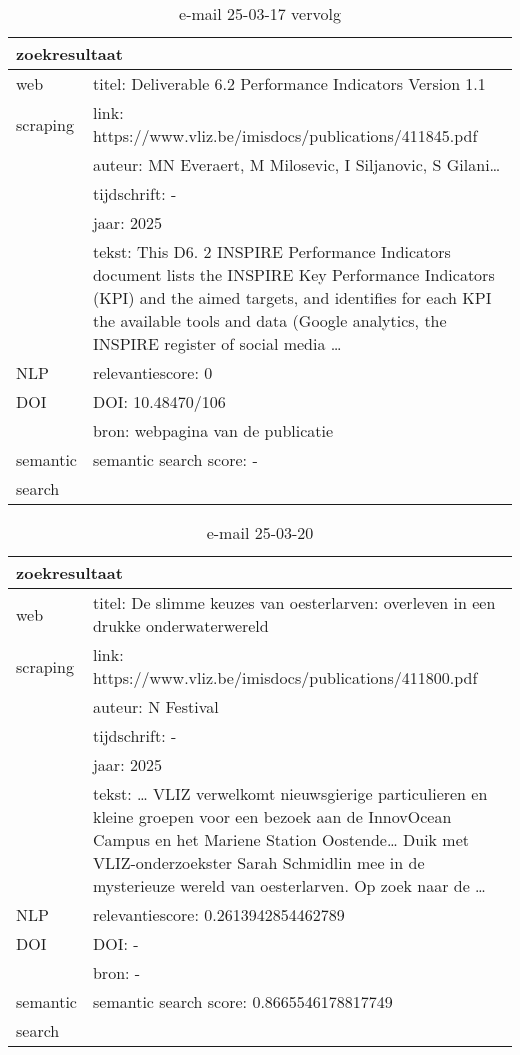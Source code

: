 \begin{table}[h!]
    \caption{e-mail 25-03-17 vervolg}
    \centering
    \begin{tabularx}{\textwidth}{|p{4cm}|X|} 
        \hline
        \multicolumn{2}{|X|}{\textbf{zoekresultaat}} \\
        \hline
        web &titel: Deliverable 6.2 Performance Indicators Version 1.1\\
        scraping&link: https://www.vliz.be/imisdocs/publications/411845.pdf\\
        &auteur: MN Everaert, M Milosevic, I Siljanovic, S Gilani…\\
        &tijdschrift: -\\
        &jaar: 2025\\
        &tekst: This D6. 2 INSPIRE Performance Indicators document lists the INSPIRE Key Performance Indicators (KPI) and the aimed targets, and identifies for each KPI the available tools and data (Google analytics, the INSPIRE register of social media …\\
        \hline
        NLP&relevantiescore: 0\\
        \hline
        DOI&DOI: 10.48470/106\\
        &bron: webpagina van de publicatie\\
        \hline
        semantic&semantic search score: -\\
        search&\\
        \hline
    \end{tabularx}
    \label{table:email20250317vervolg}
\end{table}
\begin{table}[h!]
    \caption{e-mail 25-03-20}
    \centering
    \begin{tabularx}{\textwidth}{|p{4cm}|X|} 
        \hline
        \multicolumn{2}{|X|}{\textbf{zoekresultaat}} \\
        \hline
        web &titel: De slimme keuzes van oesterlarven: overleven in een drukke onderwaterwereld\\
        scraping&link: https://www.vliz.be/imisdocs/publications/411800.pdf\\
        &auteur: N Festival\\
        &tijdschrift: -\\
        &jaar: 2025\\
        &tekst: … VLIZ verwelkomt nieuwsgierige particulieren en kleine groepen voor een bezoek aan de InnovOcean Campus en het Mariene Station Oostende… Duik met VLIZ-onderzoekster Sarah Schmidlin mee in de mysterieuze wereld van oesterlarven. Op zoek naar de …\\
        \hline
        NLP&relevantiescore: 0.2613942854462789\\
        \hline
        DOI&DOI: -\\
        &bron: -\\
        \hline
        semantic&semantic search score: 0.8665546178817749\\
        search&\\
        \hline
    \end{tabularx}
    \label{table:email20250320}
\end{table}
